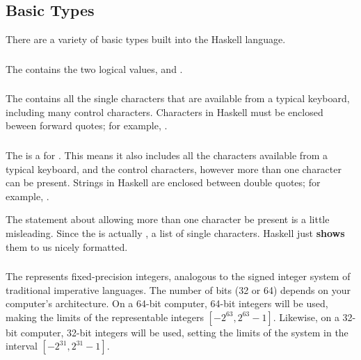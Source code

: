 \subsection{Basic Types}\label{subsec:Basic_Types}
There are a variety of basic types built into the Haskell language.

\subsubsection{\texorpdfstring{}{\texttt{Bool}}}\label{subsubsec:Bool_Type}
The   contains the two logical values,  and .

\subsubsection{\texorpdfstring{}{\texttt{Char}}}\label{subsubsec:Char_Type}
The   contains all the single characters that are available from a typical keyboard, including many control characters.
Characters in Haskell must be enclosed beween forward quotes; for example, .

\subsubsection{\texorpdfstring{}{\texttt{String}}}\label{subsubsec:String_Type}
The   is a  for \haskellinline{[Char]}.
This means it also includes all the characters available from a typical keyboard, and the control characters, however more than one character can be present.
Strings in Haskell are enclosed between double quotes; for example, .

\begin{remark*}
  The statement about allowing more than one character be present is a little misleading.
  Since the   is actually \haskellinline{[Char]}, a list of single characters.
  Haskell just \textbf{shows} them to us nicely formatted.
\end{remark*}

\subsubsection{\texorpdfstring{}{\texttt{Int}}}\label{subsubsec:Int_Type}
The   represents fixed-precision integers, analogous to the signed integer system of traditional imperative languages.
The number of bits (32 or 64) depends on your computer's architecture.
On a 64-bit computer, 64-bit integers will be used, making the limits of the representable integers $[-2^{63}, 2^{63}-1]$.
Likewise, on a 32-bit computer, 32-bit integers will be used, setting the limits of the system in the interval $[-2^{31}, 2^{31} - 1]$.


